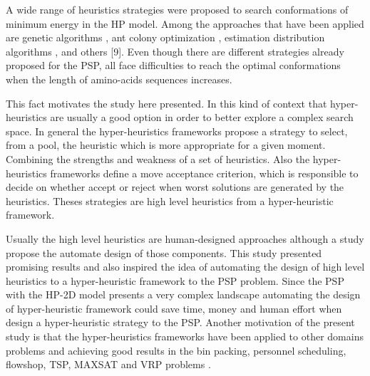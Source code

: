 \documentclass[conference]{IEEEtran}
\begin{document}

A wide range of heuristics strategies were proposed to search  conformations of minimum energy in the HP model. Among the approaches that have been applied are genetic algorithms \cite{unger1993genetic}, ant colony optimization \cite{shmygelska2002ant, shmygelska2003improved}, estimation distribution algorithms \cite{santana2008component}, and others [9]. Even though there are different strategies already proposed for the PSP, all face difficulties to reach the optimal conformations when the length of amino-acids sequences increases.
  
   This fact motivates the study here presented. In this kind of context that hyper-heuristics are usually a good option in order to better explore a complex search space. In general the hyper-heuristics frameworks propose a strategy to select, from a pool, the heuristic which is more appropriate for a given moment. Combining the strengths and weakness of a set of heuristics. Also the hyper-heuristics frameworks define a move acceptance criterion, which is responsible to decide on whether accept or reject when worst solutions are generated by the heuristics. Theses strategies are high level heuristics from a hyper-heuristic framework. 
 
 Usually the high level heuristics are human-designed approaches although a study \cite{sabar2015automatic} propose the automate design of those components. This study presented promising results and also inspired the idea of automating the design of high level heuristics to a hyper-heuristic framework to the PSP problem. Since the PSP with the HP-2D model presents a very complex landscape automating the design of hyper-heuristic framework could save time, money and human effort when design a hyper-heuristic strategy to the PSP. Another motivation of the present study is that the hyper-heuristics frameworks have been applied to other domains problems and achieving good results in the bin packing, personnel scheduling, flowshop, TSP, MAXSAT and VRP problems \cite{sabar2015automatic}.
 
\end{document}
